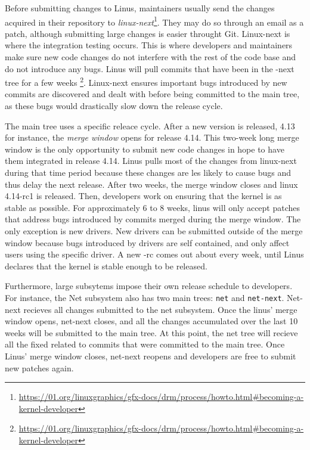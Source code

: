 Before submitting changes to Linus, maintainers usually send the changes acquired in their repository to \textit{linux-next}\footnote{\url{https://01.org/linuxgraphics/gfx-docs/drm/process/howto.html\#becoming-a-kernel-developer}}. They may do so through an email as a patch, although submitting large changes is easier throught Git. Linux-next is where the integration testing occurs. This is where developers and maintainers make sure new code changes do not interfere with the rest of the code base and do not introduce any bugs. Linus will pull commits that have been in the -next tree for a few weeks \footnote{\url{https://01.org/linuxgraphics/gfx-docs/drm/process/howto.html\#becoming-a-kernel-developer}}. Linux-next ensures important bugs introduced by new commits are discovered and dealt with before being committed to the main tree, as these bugs would drastically slow down the release cycle. 


The main tree uses a specific releace cycle. After a new version is released, 4.13 for instance, the \textit{merge window} opens for release 4.14. This two-week long merge window is the only opportunity to submit new code changes in hope to have them integrated in release 4.14. Linus pulls most of the changes from linux-next during that time period because these changes are les likely to cause bugs and thus delay the next release. After two weeks, the merge window closes and linux 4.14-rc1 is released. Then, developers work on ensuring that the kernel is as stable as possible. For approximately 6 to 8 weeks, linus will only accept patches that address bugs introduced by commits merged during the merge window. The only exception is new drivers. New drivers can be submitted outside of the merge window because bugs introduced by drivers are self contained, and only affect users using the specific driver. A new -rc comes out about every week, until Linus declares that the kernel is stable enough to be released. 

Furthermore, large subsytems impose their own release schedule to developers. For instance, the Net subsystem also has two main trees: \texttt{net} and \texttt{net-next}. Net-next recieves all changes submitted to the net subsystem. Once the linus' merge window opens, net-next closes, and all the changes accumulated over the last 10 weeks will be submitted to the main tree. At this point, the net tree will recieve all the fixed related to commits that were committed to the main tree. Once Linus' merge window closes, net-next reopens and developers are free to submit new patches again. 

